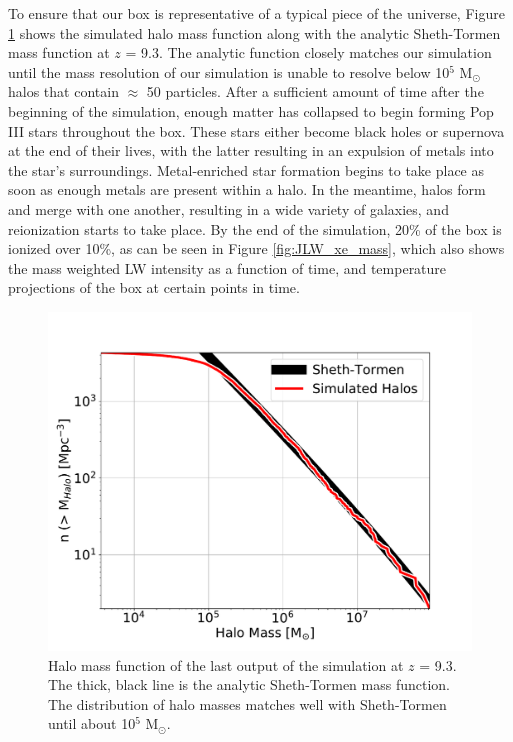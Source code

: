 \documentclass[a4paper,fleqn,usenatbib]{mnras}
\begin{document}
To ensure that our box is representative of a typical piece of the universe, Figure \ref{fig:hmf} shows the simulated halo mass function along with the analytic Sheth-Tormen mass function at $z$ = 9.3. The analytic function closely matches our simulation until the mass resolution of our simulation is unable to resolve below 10$^{5}$ M$_{\odot}$ halos that contain $\approx$ 50 particles. After a sufficient amount of time after the beginning of the simulation, enough matter has collapsed to begin forming Pop III stars throughout the box. These stars either become black holes or supernova at the end of their lives, with the latter resulting in an expulsion of metals into the star's surroundings. Metal-enriched star formation begins to take place as soon as enough metals are present within a halo. In the meantime, halos form and merge with one another, resulting in a wide variety of galaxies, and reionization starts to take place. By the end of the simulation, 20\% of the box is ionized over 10\%, as can be seen in Figure \ref{fig:JLW_xe_mass}, which also shows the mass weighted LW intensity as a function of time, and temperature projections of the box at certain points in time. 

\begin{figure}
	\includegraphics[width=\columnwidth]{images/hmf.pdf}
    \caption{Halo mass function of the last output of the simulation at $z$ = 9.3. The thick, black line is the analytic Sheth-Tormen mass function. The distribution of halo masses matches well with Sheth-Tormen until about 10$^{5}$ M$_{\odot}$.}
    \label{fig:hmf}
\end{figure}
\end{document}
